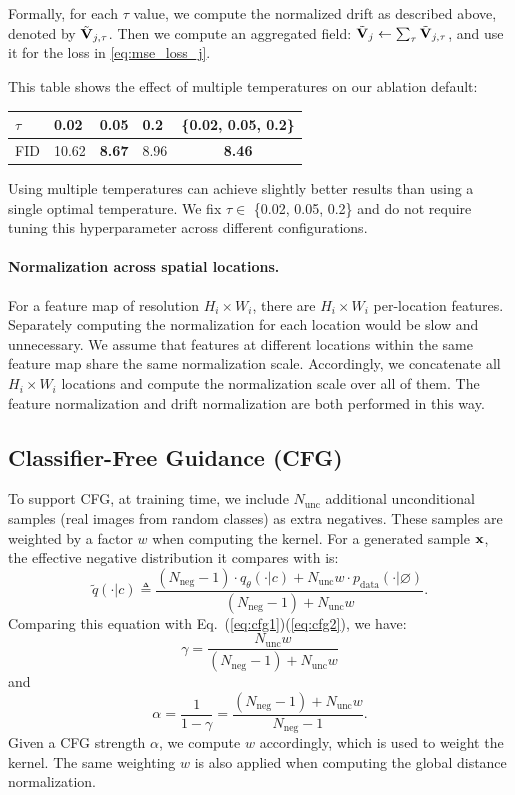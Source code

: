 Formally, for each $\tau$ value, we compute the normalized drift as described above, denoted by $\tilde{\mathbf{V}}_{j,\tau}$. Then we compute an aggregated field: $\tilde{\mathbf{V}}_j \leftarrow \sum_\tau \tilde{\mathbf{V}}_{j,\tau}$, and use it for the loss in \cref{eq:mse_loss_j}. 


This table shows the effect of multiple temperatures on our ablation default:
\begin{center}
    \tablefontsize
    \begin{tabular}{l | x{32} x{32} x{32} | c}
    \toprule
    $\tau$ & 0.02 & 0.05 & 0.2 & \{0.02, 0.05, 0.2\} \\
    \midrule
    FID & 10.62 & \textbf{8.67} & 8.96 & \textbf{8.46} \\
    \bottomrule
    \end{tabular}
\end{center}
Using multiple temperatures can achieve slightly better results than using a single optimal temperature. We fix $\tau \in $ \{0.02, 0.05, 0.2\} and do not require tuning this hyperparameter across different configurations.


\paragraph{Normalization across spatial locations.}
For a feature map of resolution $H_i{\times}W_i$, there are $H_i{\times}W_i$ per-location features.
Separately computing the normalization for each location would be slow and unnecessary.
We assume that features at different locations within the same feature map share the same normalization scale. Accordingly, we concatenate all $H_i{\times}W_i$ locations and compute the normalization scale over all of them.
The feature normalization and drift normalization are both performed in this way.


\subsection{Classifier-Free Guidance (CFG)}
\label{sec:appendix_cfg}

To support CFG, at training time, we include $N_\text{unc}$ additional \mbox{unconditional} samples (real images from random classes) as extra negatives.
These samples are weighted by a factor $w$ when computing the kernel.
For a generated sample $\mathbf{x}$, the effective negative distribution it compares with is:
\[
\tilde{q}(\cdot|c) \triangleq \frac{(N_\text{neg}{-}1) \cdot q_\theta(\cdot|c) + N_\text{unc}  w \cdot p_{\text{data}}(\cdot|\varnothing)}{(N_\text{neg}{-}1) + N_\text{unc} w}.
\]
Comparing this equation with Eq.~(\ref{eq:cfg1})(\ref{eq:cfg2}), we have:
\[
\gamma = \frac{N_\text{unc} w}{(N_\text{neg}{-}1) + N_\text{unc} w}
\]
and 
\[
\alpha = \frac{1}{1-\gamma} = \frac{(N_\text{neg}{-}1) + N_\text{unc} w}{N_\text{neg}{-}1}.
\]
Given a CFG strength $\alpha$, we compute $w$ accordingly, which is used to weight the kernel.
The same weighting $w$ is also applied when computing the global distance normalization.

